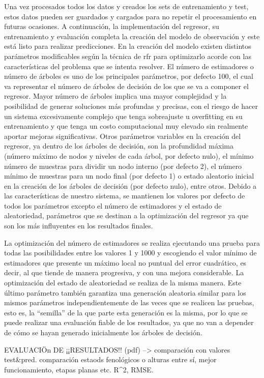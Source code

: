 \par Una vez procesados todos los datos y creados los sets de entrenamiento y test, estos datos pueden ser guardados y cargados para no repetir el procesamiento en futuras ocasiones. A continuación, la implementación del regresor, su entrenamiento y evaluación completa la creación del modelo de observación y este está listo para realizar predicciones. En la creación del modelo existen distintos parámetros modificables según la técnica de \gls{rfr} para optimizarlo acorde con las características del problema que se intenta resolver. El número de estimadores o número de árboles es uno de los principales parámetros, por defecto 100, el cual va representar el número de árboles de decisión de los que se va a componer el regresor. Mayor número de árboles implica una mayor complejidad y la posibilidad de generar soluciones más profundas y precisas, con el riesgo de hacer un sistema excesivamente complejo que tenga sobreajuste u overfitting en su entrenamiento y que tenga un costo computacional muy elevado sin realmente aportar mejoras significativas. Otros parámetros variables en la creación del regresor, ya dentro de los árboles de decisión, son la profundidad máxima (número máximo de nodos y niveles de cada árbol, por defecto nulo), el mínimo número de muestras para dividir un nodo interno (por defecto 2), el número mínimo de muestras para un nodo final (por defecto 1) o estado aleatorio inicial en la creación de los árboles de decisión (por defecto nulo), entre otros. Debido a las características de nuestro sistema, se mantienen los valores por defecto de todos los parámetros excepto el número de estimadores y el estado de aleatoriedad, parámetros que se destinan a la optimización del regresor ya que son los más influyentes en los resultados finales. 
\\
\par La optimización del número de estimadores se realiza ejecutando una prueba para todas las posibilidades entre los valores 1 y 1000 y escogiendo el valor mínimo de estimadores que presente un máximo local no puntual del error cuadrático, es decir, al que tiende de manera progresiva, y con una mejora considerable. La optimización del estado de aleatoriedad se realiza de la misma manera. Este último parámetro también garantiza una generación aleatoria similar para los mismos parámetros independientemente de las veces que se realicen las pruebas, esto es, la ``semilla'' de la que parte esta generación es la misma, por lo que se puede realizar una evaluación fiable de los resultados, ya que no van a depender de cómo se hayan generado inicialmente los árboles de decisión. 
\\
\par EVALUACIÖn DE ¡¡RESULTADOS!! (pdf) --> comparación con valores test&pred. comparación estaods fenológicos o alturas entre sí, mejor funcionamiento, etapas planas etc. R^2, RMSE. 